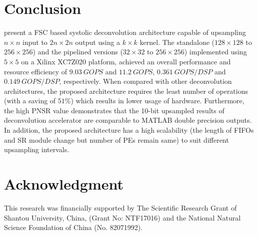 \documentclass[journal]{IEEEtran}
\begin{document}
\section{Conclusion}\label{sec:Conclusion}
 present a FSC based systolic deconvolution architecture capable of upsampling $n\times n$ input to $2n\times 2n$ output using a $k\times k$ kernel. The standalone ($128\times 128$ to $256\times 256$) and the pipelined versions ($32\times32$ to $256\times256$)  implemented using $5\times5$ on a Xilinx XC7Z020 platform, achieved an overall performance and resource efficiency of $9.03\ GOPS$ and $11.2\ GOPS$, $0.361\ GOPS/DSP$ and $0.149\ GOPS/DSP$, respectively. When compared with other deconvolution architectures, the proposed architecture requires the least number of operations (with a saving of $51\%$) which results in lower usage of hardware. Furthermore, the high PNSR value demonstrates that the 10-bit upsampled results of deconvolution accelerator are comparable to MATLAB double precision outputs. In addition, the proposed architecture has a high scalability (the length of FIFOs and SR module change but number of PEs remain same) to suit different upsampling intervals. 




\section*{Acknowledgment}
This research was financially supported by The Scientific Research Grant of Shantou University, China, (Grant No: NTF17016) and the National Natural Science Foundation of China (No. 82071992).
\appendices
\end{document}
